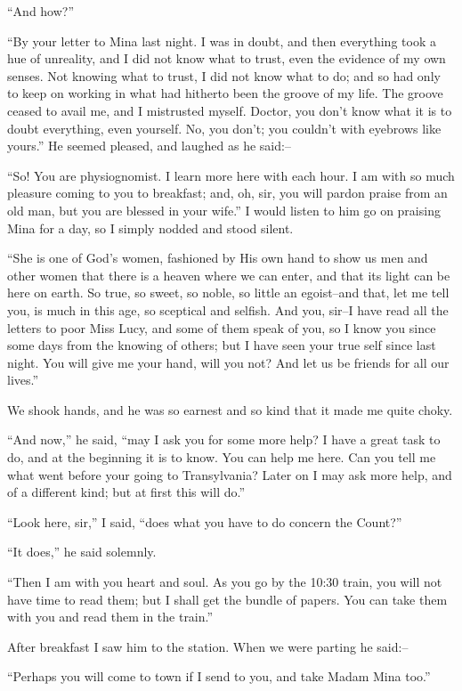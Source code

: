 \documentclass[12pt,openright]{book}
\begin{document}
“And how?”

“By your letter to Mina last night. I was in doubt, and then everything took a hue of unreality, and I did not know what to trust, even the evidence of my own senses. Not knowing what to trust, I did not know what to do; and so had only to keep on working in what had hitherto been the groove of my life. The groove ceased to avail me, and I mistrusted myself. Doctor, you don’t know what it is to doubt everything, even yourself. No, you don’t; you couldn’t with eyebrows like yours.” He seemed pleased, and laughed as he said:–

“So! You are physiognomist. I learn more here with each hour. I am with so much pleasure coming to you to breakfast; and, oh, sir, you will pardon praise from an old man, but you are blessed in your wife.” I would listen to him go on praising Mina for a day, so I simply nodded and stood silent.

“She is one of God’s women, fashioned by His own hand to show us men and other women that there is a heaven where we can enter, and that its light can be here on earth. So true, so sweet, so noble, so little an egoist–and that, let me tell you, is much in this age, so sceptical and selfish. And you, sir–I have read all the letters to poor Miss Lucy, and some of them speak of you, so I know you since some days from the knowing of others; but I have seen your true self since last night. You will give me your hand, will you not? And let us be friends for all our lives.”

We shook hands, and he was so earnest and so kind that it made me quite choky.

“And now,” he said, “may I ask you for some more help? I have a great task to do, and at the beginning it is to know. You can help me here. Can you tell me what went before your going to Transylvania? Later on I may ask more help, and of a different kind; but at first this will do.”

“Look here, sir,” I said, “does what you have to do concern the Count?”

“It does,” he said solemnly.

“Then I am with you heart and soul. As you go by the 10:30 train, you will not have time to read them; but I shall get the bundle of papers. You can take them with you and read them in the train.”

After breakfast I saw him to the station. When we were parting he said:–

“Perhaps you will come to town if I send to you, and take Madam Mina too.”
\end{document}
